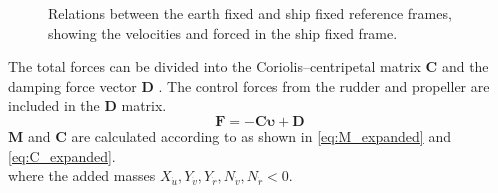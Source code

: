 \begin{figure}[h]
    \centering
    
    \caption{Relations between the earth fixed and ship fixed reference frames, showing the velocities and forced in the ship fixed frame.}
    \label{fig:reference_frames}
\end{figure}
The total forces can be divided into the Coriolis–centripetal matrix $\mathbf{C}$ and the damping force vector $\mathbf{D}$ \cite{fossenHandbookMarineCraft2011}. The control forces from the rudder and propeller are included in the $\mathbf{D}$ matrix.
\begin{equation}
    \label{eq:upsilon1d}
\mathbf{F} = - \mathbf{C} \pmb{\upsilon} + \mathbf{D}
\end{equation}
$\mathbf{M}$ and $\mathbf{C}$ are calculated according to \textcite{fossenHandbookMarineCraft2011} as shown in \autoref{eq:M_expanded} and \autoref{eq:C_expanded}. 
\begin{equation}
    \label{eq:M_expanded}
    
\end{equation}
\begin{equation}
    \label{eq:C_expanded}
    
\end{equation}
where the added masses $X_{\dot{u}},Y_{\dot{v}},Y_{\dot{r}},N_{\dot{v}},N_{\dot{r}} < 0$. 

